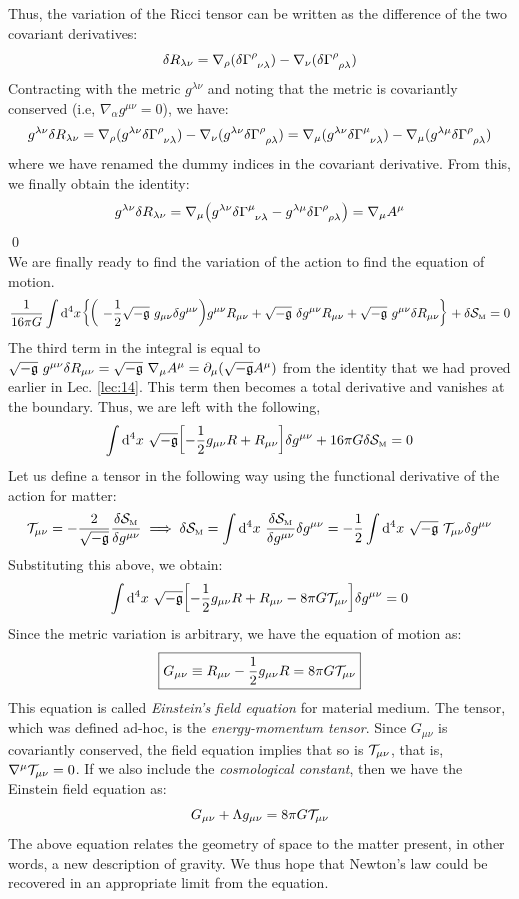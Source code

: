 Thus, the variation of the Ricci tensor can be written as the difference of the two covariant derivatives: 
$$\delta R_{\lambda\nu} = \nabla_\rho (\delta \chris{\rho}{\nu}{\lambda}) - \nabla_\nu (\delta \chris{\rho}{\rho}{\lambda})$$
Contracting with the metric $g^{\lambda\nu}$ and noting that the metric is covariantly conserved (i.e, $\nabla_\alpha g^{\mu\nu}=0$), we have:
$$g^{\lambda\nu}\delta R_{\lambda\nu} = \nabla_\rho (g^{\lambda\nu}\delta \chris{\rho}{\nu}{\lambda}) - \nabla_\nu (g^{\lambda\nu}\delta \chris{\rho}{\rho}{\lambda}) = \nabla_\mu (g^{\lambda\nu}\delta \chris{\mu}{\nu}{\lambda}) - \nabla_\mu (g^{\lambda\mu}\delta \chris{\rho}{\rho}{\lambda})$$
where we have renamed the dummy indices in the covariant derivative. From this, we finally obtain the identity:
$$g^{\lambda\nu}\delta R_{\lambda\nu} = \nabla_\mu \qty(g^{\lambda\nu}\delta \chris{\mu}{\nu}{\lambda} - g^{\lambda\mu}\delta \chris{\rho}{\rho}{\lambda}) = \nabla_\mu A^\mu$$ \qed\\
We are finally ready to find the variation of the action to find the equation of motion. 
\begin{align*}
    \frac{1}{16\pi G}\int \dd^4 x \qty{\qty(\ -\frac{1}{2}\detm \ g_{\mu\nu}\delta g^{\mu\nu}) g^{\mu\nu}R_{\mu\nu} +\detm\ \delta g^{\mu\nu}R_{\mu\nu} +  \detm\ g^{\mu\nu}\delta R_{\mu\nu}} +\delta \Ss\tund{M} =0
\end{align*}
The third term in the integral is equal to $\detm\ g^{\mu\nu}\delta R_{\mu\nu} = \detm \ \nabla_\mu A^\mu = \partial_\mu (\detm A^\mu)$ from the identity that we had proved earlier in Lec. \ref{lec:14}. This term then becomes a total derivative and vanishes at the boundary. Thus, we are left with the following,
\begin{align*}
    \int \dd^4 x\ \sqrt{-\mathfrak{g}} \qty[-\frac{1}{2}g_{\mu\nu}R +R_{\mu\nu}]\delta g^{\mu\nu} + 16\pi G \delta \mathcal S_{\text{\tiny M}}=0
\end{align*}
Let us define a tensor in the following way using the functional derivative of the action for matter:
$$\mathcal T_{\mu\nu} = -\frac{2}{\sqrt{-\mathfrak{g}}} \frac{\delta \mathcal S_{\text{\tiny M}}}{\delta g^{\mu\nu}} \implies  \delta \mathcal S_{\text{\tiny M}} = \int \dd^4x\ \frac{\delta \mathcal S_{\text{\tiny M}}}{\delta g^{\mu\nu}}\delta g^{\mu\nu} = -\frac{1}{2}\int \dd^4 x \ \sqrt{-\mathfrak{g}} \ \mathcal T_{\mu\nu}\delta g^{\mu\nu}$$
Substituting this above, we obtain:
\begin{align*}
    \int \dd^4 x\ \sqrt{-\mathfrak{g}} \qty[-\frac{1}{2}g_{\mu\nu}R +R_{\mu\nu} - 8\pi G \mathcal T_{\mu\nu}]\delta g^{\mu\nu} =0
\end{align*} 
Since the metric variation is arbitrary, we have the equation of motion as:
$$\boxed{G_{\mu\nu} \equiv R_{\mu\nu} -\frac{1}{2}g_{\mu\nu}R = 8\pi G \mathcal T_{\mu\nu}} $$
This equation is called \textit{Einstein's field equation} for material medium. The tensor, which was defined ad-hoc, is the \textit{energy-momentum tensor}. Since $G_{\mu\nu}$ is covariantly conserved, the field equation implies that so is $\mathcal T_{\mu\nu}$, that is, $\nabla^\mu \mathcal T_{\mu\nu} = 0$. If we also include the \textit{cosmological constant}, then we have the Einstein field equation as:
$$G_{\mu\nu} + \Lambda g_{\mu\nu} = 8\pi G \mathcal T_{\mu\nu}$$
The above equation relates the geometry of space to the matter present, in other words, a new description of gravity. We thus hope that Newton's law could be recovered in an appropriate limit from the equation. 
